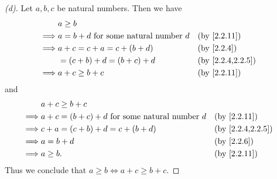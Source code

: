 \begin{proof}[(d)]
  Let \(a, b, c\) be natural numbers.
  Then we have
  \begin{align*}
             & a \geq b                                                           \\
    \implies & a = b + d \text{ for some natural number } d &  & \by{2.2.11}      \\
    \implies & a + c = c + a = c + (b + d)                  &  & \by{2.2.4}       \\
             & = (c + b) + d = (b + c) + d                  &  & \by{2.2.4,2.2.5} \\
    \implies & a + c \geq b + c                             &  & \by{2.2.11}
  \end{align*}
  and
  \begin{align*}
             & a + c \geq b + c                                                             \\
    \implies & a + c = (b + c) + d \text{ for some natural number } d &  & \by{2.2.11}      \\
    \implies & c + a = (c + b) + d = c + (b + d)                      &  & \by{2.2.4,2.2.5} \\
    \implies & a = b + d                                              &  & \by{2.2.6}       \\
    \implies & a \geq b.                                              &  & \by{2.2.11}
  \end{align*}
  Thus we conclude that \(a \geq b \iff a + c \geq b + c\).
\end{proof}

